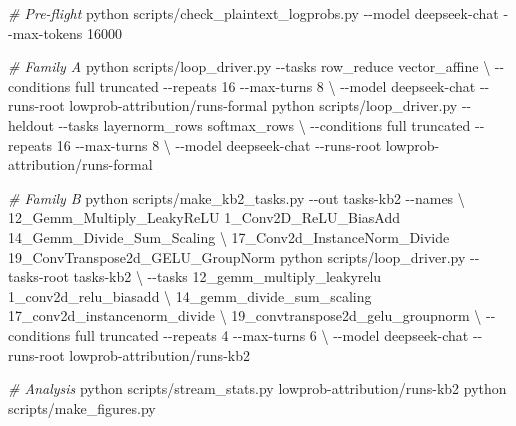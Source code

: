 \documentclass[
  11pt,
]{article}
\newenvironment{Shaded}{}{}
\newcommand{\AttributeTok}[1]{\textcolor[rgb]{0.49,0.56,0.16}{#1}}
\newcommand{\CommentTok}[1]{\textcolor[rgb]{0.38,0.63,0.69}{\textit{#1}}}
\newcommand{\DataTypeTok}[1]{\textcolor[rgb]{0.56,0.13,0.00}{#1}}
\newcommand{\ExtensionTok}[1]{#1}
\newcommand{\NormalTok}[1]{#1}
\begin{document}
\begin{Shaded}
\begin{Highlighting}[]
\CommentTok{\# Pre{-}flight}
\ExtensionTok{python}\NormalTok{ scripts/check\_plaintext\_logprobs.py }\AttributeTok{{-}{-}model}\NormalTok{ deepseek{-}chat }\AttributeTok{{-}{-}max{-}tokens}\NormalTok{ 16000}

\CommentTok{\# Family A}
\ExtensionTok{python}\NormalTok{ scripts/loop\_driver.py }\AttributeTok{{-}{-}tasks}\NormalTok{ row\_reduce vector\_affine }\DataTypeTok{\textbackslash{}}
    \AttributeTok{{-}{-}conditions}\NormalTok{ full truncated }\AttributeTok{{-}{-}repeats}\NormalTok{ 16 }\AttributeTok{{-}{-}max{-}turns}\NormalTok{ 8 }\DataTypeTok{\textbackslash{}}
    \AttributeTok{{-}{-}model}\NormalTok{ deepseek{-}chat }\AttributeTok{{-}{-}runs{-}root}\NormalTok{ lowprob{-}attribution/runs{-}formal}
\ExtensionTok{python}\NormalTok{ scripts/loop\_driver.py }\AttributeTok{{-}{-}heldout} \AttributeTok{{-}{-}tasks}\NormalTok{ layernorm\_rows softmax\_rows }\DataTypeTok{\textbackslash{}}
    \AttributeTok{{-}{-}conditions}\NormalTok{ full truncated }\AttributeTok{{-}{-}repeats}\NormalTok{ 16 }\AttributeTok{{-}{-}max{-}turns}\NormalTok{ 8 }\DataTypeTok{\textbackslash{}}
    \AttributeTok{{-}{-}model}\NormalTok{ deepseek{-}chat }\AttributeTok{{-}{-}runs{-}root}\NormalTok{ lowprob{-}attribution/runs{-}formal}

\CommentTok{\# Family B}
\ExtensionTok{python}\NormalTok{ scripts/make\_kb2\_tasks.py }\AttributeTok{{-}{-}out}\NormalTok{ tasks{-}kb2 }\AttributeTok{{-}{-}names} \DataTypeTok{\textbackslash{}}
\NormalTok{    12\_Gemm\_Multiply\_LeakyReLU 1\_Conv2D\_ReLU\_BiasAdd 14\_Gemm\_Divide\_Sum\_Scaling }\DataTypeTok{\textbackslash{}}
\NormalTok{    17\_Conv2d\_InstanceNorm\_Divide 19\_ConvTranspose2d\_GELU\_GroupNorm}
\ExtensionTok{python}\NormalTok{ scripts/loop\_driver.py }\AttributeTok{{-}{-}tasks{-}root}\NormalTok{ tasks{-}kb2 }\DataTypeTok{\textbackslash{}}
    \AttributeTok{{-}{-}tasks}\NormalTok{ 12\_gemm\_multiply\_leakyrelu 1\_conv2d\_relu\_biasadd }\DataTypeTok{\textbackslash{}}
\NormalTok{            14\_gemm\_divide\_sum\_scaling 17\_conv2d\_instancenorm\_divide }\DataTypeTok{\textbackslash{}}
\NormalTok{            19\_convtranspose2d\_gelu\_groupnorm }\DataTypeTok{\textbackslash{}}
    \AttributeTok{{-}{-}conditions}\NormalTok{ full truncated }\AttributeTok{{-}{-}repeats}\NormalTok{ 4 }\AttributeTok{{-}{-}max{-}turns}\NormalTok{ 6 }\DataTypeTok{\textbackslash{}}
    \AttributeTok{{-}{-}model}\NormalTok{ deepseek{-}chat }\AttributeTok{{-}{-}runs{-}root}\NormalTok{ lowprob{-}attribution/runs{-}kb2}

\CommentTok{\# Analysis}
\ExtensionTok{python}\NormalTok{ scripts/stream\_stats.py lowprob{-}attribution/runs{-}kb2}
\ExtensionTok{python}\NormalTok{ scripts/make\_figures.py}
\end{Highlighting}
\end{Shaded}
\end{document}
